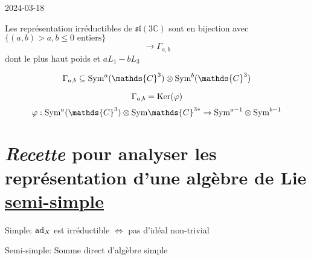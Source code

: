 


2024-03-18

\begin{tcolorbox}[title=Rappels]
	Les représentation irréductibles de \(\mathfrak{sl}(3 \mathds{C})\) sont en bijection avec \(\{ (a,b) > a,b \leq 0 \text{ entiers}  \} \)
	\[ \to \Gamma_{a,b} \]
	dont le plus haut poids et \(aL_1 - b L_3\)

	\[ \Gamma_{a,b} \subseteq {\rm{}Sym}^a ( \mathds{C}^{3}) \otimes {\rm{}Sym}^b ( \mathds{C}^{3})  \]

	\[ \Gamma_{a,b} = {\rm{}Ker}(\varphi) \]
	\[ \varphi: {\rm{}Sym}^a ( \mathds{C}^{3}) \otimes {\rm{}Sym} \mathds{C}^{3*} \to {\rm{}Sym}^{a-1} \otimes {\rm{}Sym}^{b-1} \]
\end{tcolorbox}

\section*{\textit{Recette} pour analyser les représentation d'une algèbre de Lie \underline{semi-simple}}

\begin{tcolorbox}[title=Rappel]
	Simple: \( {\rm{}ad}_X \)  est irréductible \(\iff\) pas d'idéal non-trivial
\end{tcolorbox}

Semi-simple: Somme direct d'algèbre simple

